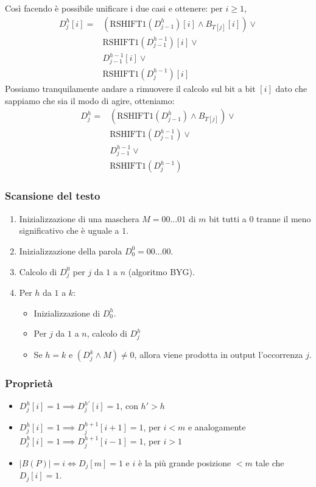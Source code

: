 Così facendo è possibile unificare i due casi e ottenere: per $i \geq 1$, 
\begin{equation*}
    \begin{split}
        D^h_j[i] = & \left(\mbox{RSHIFT1}(D^h_{j-1})[i] \land B_{T[j]}[i]\right) \lor \\
        & \mbox{RSHIFT1}(D^{h-1}_{j-1})[i] \lor\\ 
        &  D^{h-1}_{j-1}[i]  \lor\\
        & \mbox{RSHIFT1}(D^{h-1}_{j})[i]
    \end{split}
\end{equation*}
Possiamo tranquilamente andare a rimuovere il calcolo sul bit a bit $[i]$ dato che sappiamo che sia il modo di agire, otteniamo:
\begin{equation*}
    \begin{split}
        D^h_j = & \left(\mbox{RSHIFT1}(D^h_{j-1}) \land B_{T[j]}\right) \lor \\
        & \mbox{RSHIFT1}(D^{h-1}_{j-1}) \lor\\ 
        &  D^{h-1}_{j-1}  \lor\\
        & \mbox{RSHIFT1}(D^{h-1}_{j})
    \end{split}
\end{equation*} 
\subsubsection{Scansione del testo}
\begin{enumerate}
    \item Inizializzazione di una maschera $M = 00\dots01$ di $m$ bit tutti a $0$ tranne il meno significativo che è uguale a $1$.
    \item Inizializzazione della parola $D^0_0 = 00\dots00$.
    \item Calcolo di $D^0_j$ per $j$ da $1$ a $n$ (algoritmo BYG).
    \item Per $h$ da $1$ a $k$: 
    \begin{itemize}
        \item Inizializzazione di $D^h_0$.
        \item Per $j$ da $1$ a $n$, calcolo di $D^h_j$
        \item Se $h=k$ e $(D^k_j \land M) \neq 0$, allora viene prodotta in output l’occorrenza $j$. 
    \end{itemize}
\end{enumerate}
\subsubsection{Proprietà}
\begin{itemize}
    \item $D^h_j[i]=1 \implies D^{h'}_j[i] = 1$, con $h' > h$
    \item $D^h_j[i] = 1 \implies D^{h+1}_j[i+1] = 1$, per $i<m$ e analogamente  $D^h_j[i] = 1 \implies D^{h+1}_j[i-1] = 1$, per $i>1$
    \item $|B(P)| = i \iff D_j[m] = 1$ e $i$ è la più grande posizione $< m$ tale che $D_j[i]=1$.
\end{itemize}